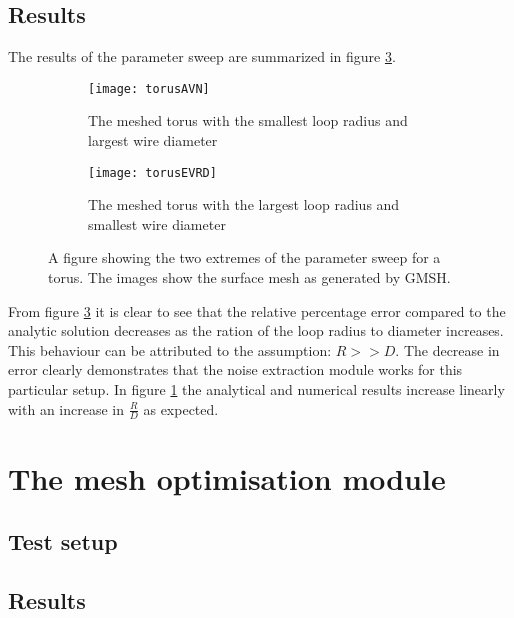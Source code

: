 \subsection{Results}

The results of the parameter sweep are summarized in figure \ref{fig:resTorus}.
\begin{figure}[H]
    \centering
    \begin{subfigure}[b]{0.48\textwidth}
        \centering
        \texttt{[image: torusAVN]}
        \caption{The meshed torus with the smallest loop radius and largest wire diameter}
        \label{fig:MSFNvRD}
    \end{subfigure}
    \hfill
    \begin{subfigure}[b]{0.48\textwidth}
        \centering
        \texttt{[image: torusEVRD]}
        \caption{The meshed torus with the largest loop radius and smallest wire diameter}
        \label{fig:evRD}
    \end{subfigure}
    \caption{A figure showing the two extremes of the parameter sweep for a torus. The images show the surface mesh as generated by GMSH.}
    \label{fig:resTorus}
\end{figure}
From figure \ref{fig:resTorus} it is clear to see that the relative percentage error compared to the analytic solution decreases as the ration of the loop radius to diameter increases. This behaviour can be attributed to the assumption: $R >> D$. The decrease in error clearly demonstrates that the noise extraction module works for this particular setup. In figure \ref{fig:MSFNvRD} the analytical and numerical results increase linearly with an increase in $\frac{R}{D}$ as expected.

\section{The mesh optimisation module}

\subsection{Test setup}
\subsection{Results}